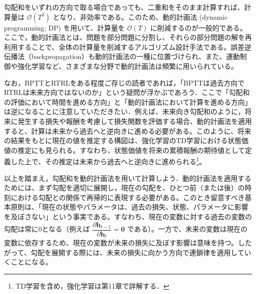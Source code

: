 \documentclass[titlepage]{ltjsbook}
\begin{document}
勾配和をいずれの方向で取る場合であっても、二重和をそのまま計算すれば、計算量は $\mathcal{O}(T^2)$ となり、非効率である。このため、動的計画法 (dynamic programming; DP) を用いて、計算量を $\mathcal{O}(T)$ に削減するのが一般的である。ここで，動的計画法とは、問題を部分問題に分割し、それらの部分問題の解を再利用することで、全体の計算量を削減するアルゴリズム設計手法である。誤差逆伝播法（backpropagation）も動的計画法の一種に位置づけられ、また、運動制御や強化学習など、さまざまな分野で動的計画法は頻繁に用いられている。

なお，BPTTとRTRLをある程度ご存じの読者であれば，「BPTTは過去方向でRTRLは未来方向ではないのか」という疑問が浮かぶであろう．ここで「勾配和の評価において時間を進める方向」と「動的計画法において計算を進める方向」は逆になることに注意していただきたい．例えば、未来向き勾配和のように，将来に発生する損失や報酬を考慮して損失関数を評価する場合、動的計画法を適用すると、計算は未来から過去へと逆向きに進める必要がある。このように、将来の結果をもとに現在の値を推定する構図は、強化学習のTD学習における状態価値の推定にも見られる。すなわち、状態価値を将来の累積報酬の期待値として定義した上で、その推定は未来から過去へと逆向きに進められる\footnote{TD学習を含め，強化学習は第11章で詳解する．}。

以上を踏まえ，勾配和を動的計画法を用いて計算しよう．動的計画法を適用するためには、まず勾配を適切に展開し，現在の勾配を、ひとつ前（または後）の時刻における勾配との関係で再帰的に表現する必要がある。このとき留意すべき基本原則は、「現在の状態やパラメータは、過去の損失、状態、パラメータに影響を及ぼさない」という事実である。すなわち、現在の変数に対する過去の変数の勾配は常に0となる（例えば $\dfrac{\partial \mathbf{h}_{t-1}}{\partial \mathbf{h}_t}=\mathbf{0}$ である）。一方で、未来の変数は現在の変数に依存するため、現在の変数が未来の損失に及ぼす影響は意味を持つ。したがって、勾配を展開する際には、未来の損失に向かう方向で連鎖律を適用していくことになる。
\end{document}
